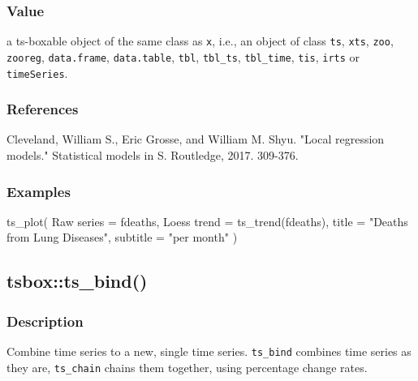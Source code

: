 \documentclass[
  letterpaper,
  DIV=11,
  numbers=noendperiod]{scrreport}
\newenvironment{Shaded}{\begin{snugshade}}{\end{snugshade}}
\newcommand{\AttributeTok}[1]{\textcolor[rgb]{0.40,0.45,0.13}{#1}}
\newcommand{\FunctionTok}[1]{\textcolor[rgb]{0.28,0.35,0.67}{#1}}
\newcommand{\NormalTok}[1]{\textcolor[rgb]{0.00,0.23,0.31}{#1}}
\newcommand{\OtherTok}[1]{\textcolor[rgb]{0.00,0.23,0.31}{#1}}
\newcommand{\StringTok}[1]{\textcolor[rgb]{0.13,0.47,0.30}{#1}}
\begin{document}
\subsubsection{Value}\label{value-33}

a ts-boxable object of the same class as \texttt{x}, i.e., an object of
class \texttt{ts}, \texttt{xts}, \texttt{zoo}, \texttt{zooreg},
\texttt{data.frame}, \texttt{data.table}, \texttt{tbl},
\texttt{tbl\_ts}, \texttt{tbl\_time}, \texttt{tis}, \texttt{irts} or
\texttt{timeSeries}.

\subsubsection{References}\label{references}

Cleveland, William S., Eric Grosse, and William M. Shyu. "Local
regression models." Statistical models in S. Routledge, 2017. 309-376.

\subsubsection{Examples}\label{examples-33}

\begin{Shaded}
\begin{Highlighting}[]
\FunctionTok{ts\_plot}\NormalTok{(}
  \StringTok{\textasciigrave{}}\AttributeTok{Raw series}\StringTok{\textasciigrave{}} \OtherTok{=}\NormalTok{ fdeaths,}
  \StringTok{\textasciigrave{}}\AttributeTok{Loess trend}\StringTok{\textasciigrave{}} \OtherTok{=} \FunctionTok{ts\_trend}\NormalTok{(fdeaths),}
  \AttributeTok{title =} \StringTok{"Deaths from Lung Diseases"}\NormalTok{,}
  \AttributeTok{subtitle =} \StringTok{"per month"}
\NormalTok{)}
\end{Highlighting}
\end{Shaded}

\subsection{tsbox::ts\_bind()}\label{tsboxts_bind}

\subsubsection{Description}\label{description-34}

Combine time series to a new, single time series. \texttt{ts\_bind}
combines time series as they are, \texttt{ts\_chain} chains them
together, using percentage change rates.
\end{document}
